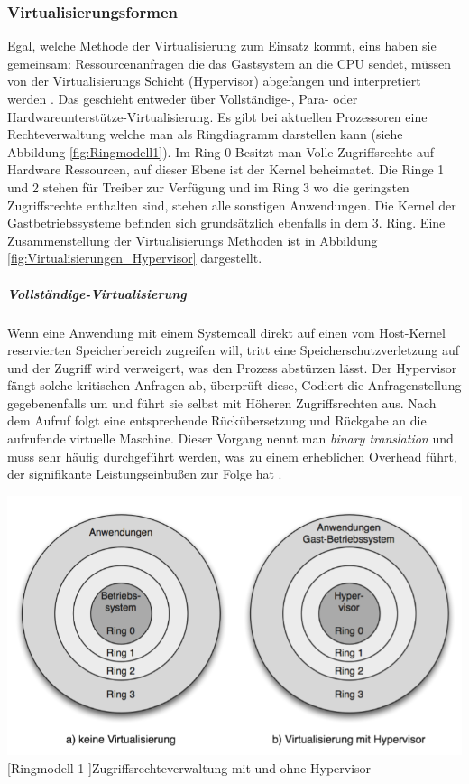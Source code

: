 \subsubsection{Virtualisierungsformen}
Egal, welche Methode der Virtualisierung zum Einsatz kommt, eins haben sie gemeinsam: Ressourcenanfragen die das Gastsystem an die CPU sendet, müssen von der Virtualisierungs Schicht (Hypervisor) abgefangen und interpretiert werden \cite{Meinel2011VirtualisierungMarktubersicht}. Das geschieht entweder über Vollständige-, Para- oder Hardwareunterstütze-Virtualisierung.  Es gibt bei aktuellen Prozessoren eine Rechteverwaltung welche man als Ringdiagramm darstellen kann (siehe Abbildung \ref{fig:Ringmodell1}). Im Ring 0 Besitzt man Volle Zugriffsrechte auf Hardware Ressourcen, auf dieser Ebene ist der Kernel beheimatet. Die Ringe 1 und 2 stehen für Treiber zur Verfügung und im Ring 3 wo die geringsten Zugriffsrechte enthalten sind, stehen alle sonstigen Anwendungen. Die Kernel der Gastbetriebssysteme befinden sich grundsätzlich ebenfalls in dem 3. Ring. Eine Zusammenstellung der Virtualisierungs Methoden ist in Abbildung \ref{fig:Virtualisierungen_Hypervisor} dargestellt.

\subparagraph{Vollständige-Virtualisierung}
 Wenn eine Anwendung mit einem Systemcall direkt auf einen vom Host-Kernel reservierten Speicherbereich zugreifen will, tritt eine Speicherschutzverletzung auf und der Zugriff wird verweigert, was den Prozess abstürzen lässt. Der Hypervisor fängt solche kritischen Anfragen ab, überprüft diese, Codiert die Anfragenstellung gegebenenfalls um und führt sie selbst mit Höheren Zugriffsrechten aus. Nach dem Aufruf folgt eine entsprechende Rückübersetzung und Rückgabe an die aufrufende virtuelle Maschine. Dieser Vorgang nennt man \glqq\emph{binary translation}\grqq{} und muss sehr häufig durchgeführt werden, was zu einem erheblichen Overhead führt, der signifikante Leistungseinbußen zur Folge hat \cite{Meinel2011VirtualisierungMarktubersicht}. 
 
 \vspace{1em}
\begin{minipage}{\linewidth}
	\centering
	\includegraphics[width=1\linewidth]{pics/Ringmodell1.PNG}
	[Ringmodell 1 ]{Zugriffsrechteverwaltung mit und ohne Hypervisor \cite{Meinel2011VirtualisierungMarktubersicht} }
	\label{fig:Ringmodell1}
\end{minipage}
 
